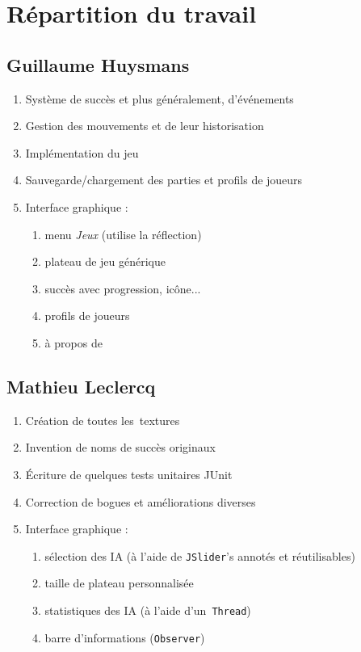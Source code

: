 \section{Répartition du travail}

\subsection{Guillaume Huysmans}
\begin{enumerate}
	\item Système de succès et plus généralement, d'événements
    \item Gestion des mouvements et de leur historisation
    \item Implémentation du jeu \oth
    \item Sauvegarde/chargement des parties et profils de joueurs
    \item Interface graphique :
    \begin{enumerate}
        \item menu \textit{Jeux} (utilise la réflection)
        \item plateau de jeu générique
        \item succès avec progression, icône...
        \item profils de joueurs
        \item à propos de
    \end{enumerate}
\end{enumerate}

\subsection{Mathieu Leclercq}
\begin{enumerate}
	\item Création de toutes les~textures
    \item Invention de noms de succès originaux
    \item Écriture de quelques tests unitaires JUnit
    \item Correction de bogues et améliorations diverses
    \item Interface graphique : 
    \begin{enumerate}
        \item sélection des IA (à l'aide de \texttt{JSlider}'s annotés et réutilisables)
        \item taille de plateau personnalisée
        \item statistiques des IA (à l'aide d'un~\texttt{Thread})
        \item barre d'informations (\texttt{Observer})
    \end{enumerate}
\end{enumerate}
